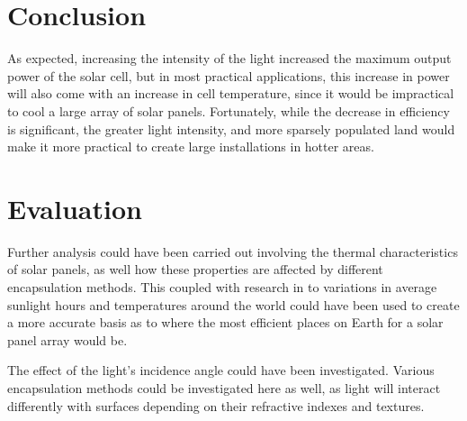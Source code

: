 \documentclass[a4paper,11pt]{article}
\begin{document}
\section{Conclusion}
As expected, increasing the intensity of the light increased the maximum output power of the solar cell, but in most practical applications, this increase in power will also come with an increase in cell temperature, since it would be impractical to cool a large array of solar panels. Fortunately, while the decrease in efficiency is significant, the greater light intensity, and more sparsely populated land would make it more practical to create large installations in hotter areas.

\section{Evaluation}
Further analysis could have been carried out involving the thermal characteristics of solar panels, as well how these properties are affected by different encapsulation methods. This coupled with research in to variations in average sunlight hours and temperatures around the world could have been used to create a more accurate basis as to where the most efficient places on Earth for a solar panel array would be.

The effect of the light's incidence angle could have been investigated. Various encapsulation methods could be investigated here as well, as light will interact differently with surfaces depending on their refractive indexes and textures.
\end{document}
